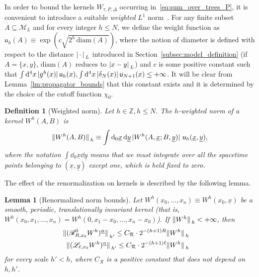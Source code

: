 \documentclass[a4paper, 11pt]{article}
\newcommand{\Z}{\mathbb{Z}}									%
\newcommand{\sing}[2]{{#1}^{#2}}							%
\newcommand{\kloc}{\mathscr{L}}								%
\newcommand{\ren}{\mathcal{R}}								%
\newcommand{\kren}{\mathscr{R}}								%
\newcommand{\weight}{\mathsf{u}}							%
\theoremstyle{thm}
\newtheorem{lm}{Lemma}
\newtheorem{defn}{Definition}
\begin{document}
In order to bound the kernels $W_{\tau, \underline{P}, \underline{\Delta}}$ occurring in~\eqref{eq:sum_over_trees_P}, it is convenient to introduce a suitable \emph{weighted} $L^1$ norm~\cite[Section 4.2.1]{Giuliani_Mastropietro_Rychkov_2021}. For any finite subset $A \subseteq \mathcal{M}_L$ and for every integer $h \le N$, we define the weight function as $\weight_h(A) \equiv \exp (c \sqrt{2^h \, \mathrm{diam}(A)})$, where the notion of diameter is defined with respect to the distance $\abs*{\, \cdot \,}_L$ introduced in Section~\ref{subsec:model_definition} (if $A = \lbrace x, y \rbrace$, $\mathrm{diam}(A)$ reduces to $\abs*{x - y}_L$) and $c$ is some positive constant such that $\int \dd[4]{x} \abs*{\sing{g}{h}(x)} \weight_h(x), \int \dd[4]{x} \abs*{\delta_N(x)} \weight_{N+1}(x) \le +\infty$. It will be clear from Lemma~\ref{lm:propagator_bounds} that this constant exists and it is determined by the choice of the cutoff function $\chi_0$.
\begin{defn}[Weighted norm]
\label{def:norm}
Let $h \in \Z, h \le N$. The $h$-weighted norm of a kernel $\sing{W}{h}(A, B)$ is
\begin{equation}
\label{eq:weighted_norm_alternative}
\norm*{\sing{W}{h}(A, B)}_{h} \equiv \int \dd_0{\underline{x}} \dd{\underline{y}} \abs*{\sing{W}{h}(A, \underline{x}; B, \underline{y})} \, \weight_h( \underline{x}, \underline{y}),
\end{equation}
where the notation $\int \dd_0{\underline{x}} \dd{\underline{y}}$ means that we must integrate over all the spacetime points belonging to $(\underline{x}, \underline{y})$ except one, which is held fixed to zero.
\end{defn}

The effect of the renormalization on kernels is described by the following lemma.
\begin{lm}[Renormalized norm bounds]
\label{lm:taylor_renormalization_gain}
Let $\sing{W}{h}(x_0, \dots, x_n) \equiv \sing{W}{h}(x_0, \underline{x})$ be a smooth, periodic, translationally invariant kernel (that is, $\sing{W}{h}(x_0, x_1, \dots, x_n) = \sing{W}{h}(0, x_1-x_0, \dots, x_n-x_0)$). If $\norm*{\sing{W}{h}}_h < +\infty$, then
\begin{subequations}
\begin{align}
\begin{split}
\label{eq:renormalization_gain_kernels}
\norm*{(\kren_{R, x_0}^0 \sing{W}{h})^{\underline{\alpha}}}_{h'} & \le C_\ren \cdot 2^{-(h+1)R} \norm*{\sing{W}{h}}_h
\end{split}\\
\begin{split}
\label{eq:localization_gain_kernels}
\norm*{(\kloc_{\ell, x_0} \sing{W}{h})^{\underline{\alpha}}}_{h'} & \le C_\ren \cdot 2^{-(h+1)\ell} \norm*{\sing{W}{h}}_h
\end{split}
\end{align}
\end{subequations}
for \emph{every} scale $h' < h$, where $C_\ren$ is a positive constant that does not depend on $h, h'$.
\end{lm}
\end{document}
